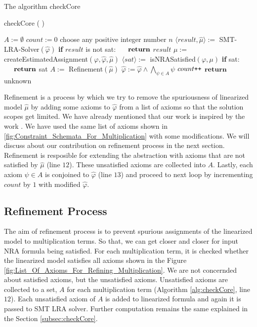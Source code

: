 \begin{algorithm}
\caption{The algorithm checkCore} 
\label{alg:checkCore}
checkCore ( )
\begin{algorithmic}[1]
\State $A := \emptyset$
\State $count := 0$
\State choose any positive integer number $n$ 
\State $\langle result, \hat{\mu} \rangle := $ SMT-LRA-Solver$(\hat{\varphi})$
\State \textbf{if} $result$ is not sat:
\State $\hspace{5mm} \textbf{return}$ $result$
\State $\mu := $ createEstimatedAssignment$(\varphi, \hat{\varphi}, \hat{\mu})$
\State $\langle sat \rangle := $ isNRASatisfied$(\varphi, \mu)$
\State \textbf{if} sat:
\State $\hspace{5mm} \textbf{return}$ sat
\State $A := $ Refinement$(\hat{\mu})$
\State $\hat{\varphi} := \hat{\varphi} \wedge \bigwedge\limits_{\psi \in A} \psi$
\State $count\verb!++!$
\EndWhile
\State $\textbf{return}$ unknown
\end{algorithmic}
\end{algorithm}

\noindent Refinement is a process by which we try to remove the spuriousness of linearized model $\hat{\mu}$ by adding some axioms to $\hat{\varphi}$ from a list of axioms so that the solution scopes get limited.
We have already mentioned that our work is inspired by the work \cite{Cimatti:2018:ILS:3274693.3230639}.
We have used the same list of axioms shown in \ref{fig:Constraint_Schemata_For_Multiplication} with some modifications.
We will discuss about our contribution on refinement process in the next section.
Refinement is resposible for extending the abstraction with axioms that are not satisfied by $\hat{\mu}$ (line $12$).
These unsatisfied axioms are collected into $A$.
Lastly, each axiom $\psi \in A$ is conjoined to $\hat{\varphi}$ (line $13$) and proceed to next loop by incrementing $count$ by $1$ with modified $\hat{\varphi}$.
\subsection{Refinement Process}
\label{subsec:Refinement_Process}
The aim of refinement process is to prevent spurious assignments of the linearized model to multiplication terms.
So that, we can get closer and closer for input NRA formula being satisfied.
For each multiplication term, it is checked whether the linearized model satisfies all axioms shown in the Figure \ref{fig:List_Of_Axioms_For_Refining_Multiplication}.
We are not concernded about satisfied axioms, but the unsatisfied axioms.
Unsatisfied axioms are collected to a set, $A$ for each multiplication term (Algorithm \ref{alg:checkCore}, line $12$).
Each unsatisfied axiom of $A$ is added to linearized formula and again it is passed to SMT LRA solver.
Further computation remains the same explained in the Section \ref{subsec:checkCore}.\newline

